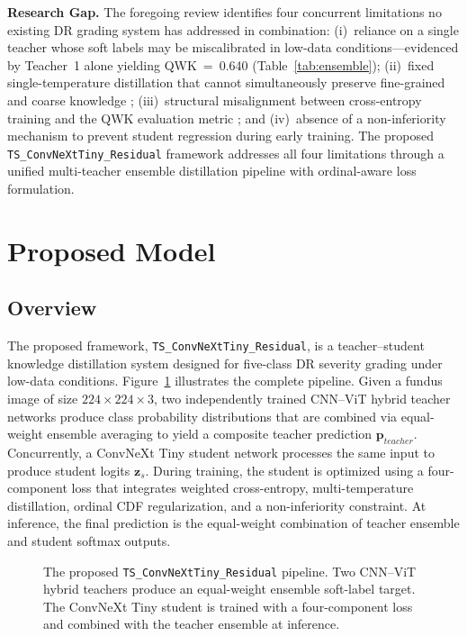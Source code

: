 \documentclass[a4paper,fleqn]{cas-dc}
\begin{document}
\textbf{Research Gap.} The foregoing review identifies four concurrent limitations no existing DR grading system has addressed in combination: (i)~reliance on a single teacher whose soft labels may be miscalibrated in low-data conditions---evidenced by Teacher~1 alone yielding QWK~=~0.640 (Table~\ref{tab:ensemble}); (ii)~fixed single-temperature distillation that cannot simultaneously preserve fine-grained and coarse knowledge \cite{hinton2015,gou2021}; (iii)~structural misalignment between cross-entropy training and the QWK evaluation metric \cite{bappi2025}; and (iv)~absence of a non-inferiority mechanism to prevent student regression during early training. The proposed \texttt{TS\_ConvNeXtTiny\_Residual} framework addresses all four limitations through a unified multi-teacher ensemble distillation pipeline with ordinal-aware loss formulation.

\section{Proposed Model}

\subsection{Overview}
\label{sec:overview}

The proposed framework, \texttt{TS\_ConvNeXtTiny\_Residual}, is a teacher--student knowledge distillation system designed for five-class DR severity grading under low-data conditions. Figure~\ref{fig:architecture} illustrates the complete pipeline. Given a fundus image of size $224 \times 224 \times 3$, two independently trained CNN--ViT hybrid teacher networks produce class probability distributions that are combined via equal-weight ensemble averaging to yield a composite teacher prediction $\mathbf{p}_{teacher}$. Concurrently, a ConvNeXt Tiny student network \cite{liu2022} processes the same input to produce student logits $\mathbf{z}_s$. During training, the student is optimized using a four-component loss that integrates weighted cross-entropy, multi-temperature distillation, ordinal CDF regularization, and a non-inferiority constraint. At inference, the final prediction is the equal-weight combination of teacher ensemble and student softmax outputs.

\begin{figure}[h]
  \centering
  \caption{The proposed \texttt{TS\_ConvNeXtTiny\_Residual} pipeline. Two CNN--ViT hybrid teachers produce an equal-weight ensemble soft-label target. The ConvNeXt Tiny student is trained with a four-component loss and combined with the teacher ensemble at inference.}
  \label{fig:architecture}
\end{figure}
\end{document}
